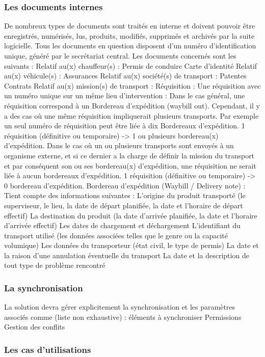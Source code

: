 \documentclass[11pt,fleqn]{book} %
\begin{document}
\subsubsection{Les documents internes}
De nombreux types de documents sont traités en interne et doivent pouvoir être enregistrés, numérisés, lus, produits, modifiés, supprimés et archivés par la suite logicielle. Tous les documents en question disposent d'un numéro d'identification unique, généré par le secrétariat central. Les documents concernés sont les suivants :
Relatif au(x) chauffeur(s) :
Permis de conduire
Carte d'identité
Relatif au(x) véhicule(s) :
Assurances
Relatif au(x) société(s) de transport :
Patentes
Contrats
Relatif au(x) mission(s) de transport :
Réquisition :
Une réquisition avec un numéro unique sur un même lieu d'intervention : Dans le cas général, une réquisition correspond à un Bordereau d'expédition (waybill out). Cependant, il y a des cas où une même réquisition impliquerait plusieurs transports. Par exemple un seul numéro de réquisition peut être liée à dix Bordereaux d'expédition. 1 réquisition (définitive ou temporaire) -> 1 ou plusieurs bordereau(x) d'expédition.
Dans le cas où un ou plusieurs transports sont envoyés à un organisme externe, et si ce dernier a la charge de définir la mission du transport et par conséquent son ou ses bordereau(x) d'expédition, une réquisition ne serait liée à aucun bordereaux d'expédition. 1 réquisition (définitive ou temporaire) -> 0 bordereau d'expédition.
Bordereau d'expédition (Waybill / Delivery note) :
Tient compte des informations suivantes :
L'origine du produit transporté (le superviseur, le lieu, la date de départ planifiée, la date et l'horaire de départ effectif)
La destination du produit (la date d'arrivée planifiée, la date et l'horaire d'arrivée effectif)
Les dates de chargement et déchargement
L'identifiant du transport utilisé (les données associées telles que le genre ou la capacité volumique) 
Les données du transporteur (état civil, le type de permis)
La date et la raison d'une annulation éventuelle du transport 
La date et la description de tout type de problème rencontré

\subsubsection{La synchronisation}
La solution devra gérer explicitement la synchronisation et les paramètres associés comme (liste non exhaustive) :
éléments à synchroniser
Permissions
Gestion des conflits

\subsubsection{Les cas d'utilisations}
\end{document}
